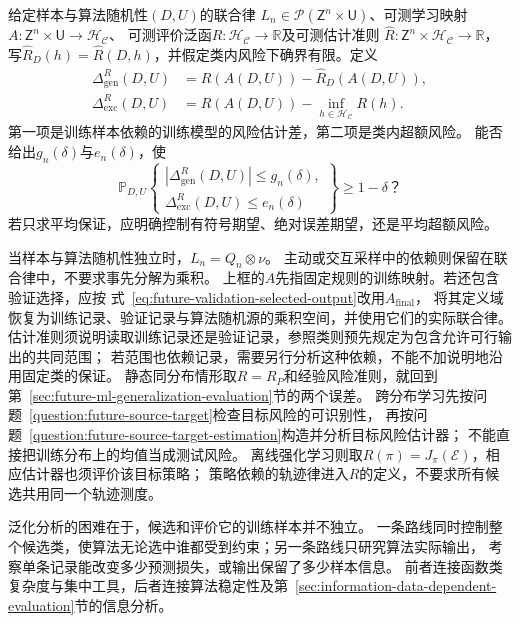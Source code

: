 \begin{mathproblem}[给定学习规则的泛化与超额风险]
  \label{question:future-learned-risk}
  给定样本与算法随机性$(D,U)$的联合律
  $L_n\in\mathcal P(\mathsf Z^n\times\mathsf U)$、可测学习映射
  $A:\mathsf Z^n\times\mathsf U\to\mathcal H_{\mathcal C}$、
  可测评价泛函$R:\mathcal H_{\mathcal C}\to\mathbb R$及可测估计准则
  $\widehat R:\mathsf Z^n\times\mathcal H_{\mathcal C}\to\mathbb R$，
  写$\widehat R_D(h)=\widehat R(D,h)$，并假定类内风险下确界有限。定义
  \[
    \begin{aligned}
      \Delta_{\mathrm{gen}}^R(D,U)
        &=R(A(D,U))-\widehat R_D(A(D,U)),\\
      \Delta_{\mathrm{exc}}^R(D,U)
        &=R(A(D,U))-\inf_{h\in\mathcal H_{\mathcal C}}R(h).
    \end{aligned}
  \]
  第一项是训练样本依赖的训练模型的风险估计差，第二项是类内超额风险。
  能否给出$g_n(\delta)$与$e_n(\delta)$，使
  \[
    \mathbb P_{D,U}\!\left\{
      \begin{gathered}
        |\Delta_{\mathrm{gen}}^R(D,U)|\leq g_n(\delta),\\
        \Delta_{\mathrm{exc}}^R(D,U)\leq e_n(\delta)
      \end{gathered}
    \right\}\geq1-\delta\text{？}
  \]
  若只求平均保证，应明确控制有符号期望、绝对误差期望，还是平均超额风险。
\end{mathproblem}

当样本与算法随机性独立时，$L_n=Q_n\otimes\nu$。
主动或交互采样中的依赖则保留在联合律中，不要求事先分解为乘积。
上框的$A$先指固定规则的训练映射。若还包含验证选择，应按
式~\eqref{eq:future-validation-selected-output}改用$A_{\mathrm{final}}$，
将其定义域恢复为训练记录、验证记录与算法随机源的乘积空间，并使用它们的实际联合律。
估计准则须说明读取训练记录还是验证记录，参照类则预先规定为包含允许可行输出的共同范围；
若范围也依赖记录，需要另行分析这种依赖，不能不加说明地沿用固定类的保证。
静态同分布情形取$R=R_P$和经验风险准则，就回到
第~\ref{sec:future-ml-generalization-evaluation}节的两个误差。
跨分布学习先按问题~\ref{question:future-source-target}检查目标风险的可识别性，
再按问题~\ref{question:future-source-target-estimation}构造并分析目标风险估计器；
不能直接把训练分布上的均值当成测试风险。
离线强化学习则取$R(\pi)=J_\pi(\mathcal E)$，相应估计器也须评价该目标策略；
策略依赖的轨迹律进入$R$的定义，不要求所有候选共用同一个轨迹测度。

泛化分析的困难在于，候选和评价它的训练样本并不独立。
一条路线同时控制整个候选类，使算法无论选中谁都受到约束；另一条路线只研究算法实际输出，
考察单条记录能改变多少预测损失，或输出保留了多少样本信息。
前者连接函数类复杂度与集中工具，后者连接算法稳定性及第~\ref{sec:information-data-dependent-evaluation}节的信息分析。

